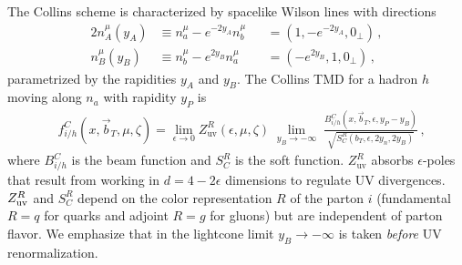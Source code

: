\documentclass[11pt,a4paper]{article}
\newcommand{\eps}{\epsilon}
\newcommand{\nn}{\nonumber}
\newcommand{\bt}{\vec b_T}
\newcommand{\uv}{\mathrm{uv}}
\newcommand{\na}{n_a}
\newcommand{\nb}{n_b}
\newcommand{\nA}{n_A}
\newcommand{\nB}{n_B}
\begin{document}
The Collins scheme is characterized by spacelike Wilson lines with directions
\begin{alignat}{2} \label{eq:nb}
 \nA^\mu(y_A) &\equiv \na^\mu - e^{-2y_A} \nb^\mu &&= (1, -e^{-2 y_A}, 0_\perp)
\,,\nn\\
 \nB^\mu(y_B) &\equiv \nb^\mu - e^{2y_B} \na^\mu &&= (-e^{2 y_B}, 1, 0_\perp)
\,,\end{alignat}
parametrized by the rapidities $y_A$ and $y_B$.
The Collins TMD for a hadron $h$ moving along $n_a$ with rapidity $y_P$ is
\begin{align} \label{eq:tmdpdf_Collins}
 & f^C_{i/h}(x, \bt, \mu, \zeta)
 = \lim_{\eps\to0} Z_\uv^R(\eps, \mu, \zeta)
   \lim_{\substack{y_B \to -\infty}}
   \frac{B^C_{i/h}(x, \bt, \eps, y_P - y_B)}{\sqrt{S_C^R(b_T, \eps, 2y_n, 2y_B)}}
\,,\end{align}
where $B^C_{i/h}$ is the beam function and $S_C^R$ is the soft function.
$Z_\uv^R$ absorbs $\eps$-poles that result from working in $d=4-2\eps$ dimensions to regulate UV divergences.
$Z_{\rm uv}^R$ and $S_C^R$ depend on the color representation $R$ of the parton $i$ (fundamental $R=q$ for quarks and adjoint $R=g$ for gluons) but are independent of parton flavor.
We emphasize that in  the lightcone limit $y_B \to -\infty$ is taken \emph{before} UV renormalization.
\end{document}
